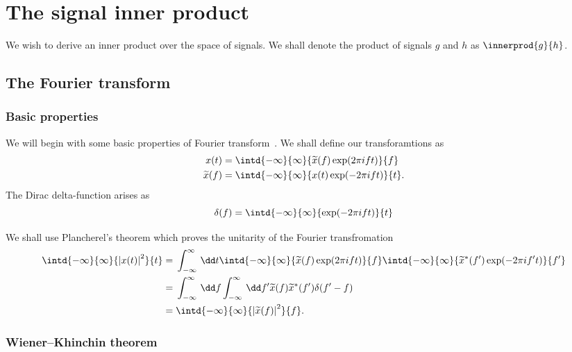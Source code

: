 \chapter{The signal inner product}

We wish to derive an inner product over the space of signals. We shall denote the product of signals $g$ and $h$ as $\innerprod{g}{h}$.

\section{The Fourier transform}

\subsection{Basic properties}

We will begin with some basic properties of Fourier transform~\citep{Riley2002}. We shall define our transforamtions as
\begin{subequations}
\begin{align}
x(t) = {} & \intd{-\infty}{\infty}{\widetilde{x}(f)\exp(2\pi ift)}{f} \\
\widetilde{x}(f) = {} & \intd{-\infty}{\infty}{x(t)\exp(-2\pi ift)}{t}.
\end{align}
\end{subequations}
The Dirac delta-function arises as
\begin{equation}
\delta(f) = \intd{-\infty}{\infty}{\exp(-2\pi ift)}{t}
\end{equation}

We shall use Plancherel's theorem which proves the unitarity of the Fourier transfromation
\begin{align}
\intd{-\infty}{\infty}{\left|x(t)\right|^2}{t} = {} & \int_{-\infty}^\infty\,\dd t \intd{-\infty}{\infty}{\widetilde{x}(f)\exp(2\pi ift)}{f} \intd{-\infty}{\infty}{\widetilde{x}^\ast(f')\exp(-2\pi if't)}{f'} \nonumber \\
 = {} & \int_{-\infty}^\infty\,\dd f \int_{-\infty}^\infty\,\dd f' \widetilde{x}(f) \widetilde{x}^\ast(f') \delta(f' - f) \nonumber \\
 = {} & \intd{-\infty}{\infty}{\left|\widetilde{x}(f)\right|^2}{f}.
\end{align}

\subsection{Wiener–Khinchin theorem}

